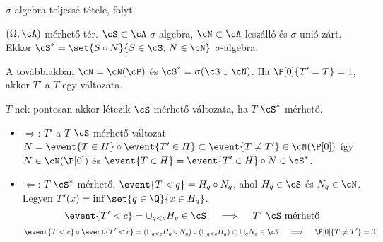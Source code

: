 \documentclass[aspectratio=169,notheorems,9pt,\option]{beamer}
\begin{document}
\begin{frame}{$\sigma$-algebra teljessé tétele, folyt.}
  \begin{proposition}
    $(\Omega,\cA)$ mérhető tér. $\cS\subset\cA$ $\sigma$-algebra, 
    $\cN\subset\cA$ leszálló és $\sigma$-unió zárt. Ekkor
    $\cS^*=\set{S\circ N}{S\in\cS,\,N\in\cN}$ $\sigma$-algebra.
  \end{proposition}
  
  A továbbiakban $\cN=\cN(\cP)$ és $\cS^*=\sigma(\cS\cup\cN)$.
  Ha $\P[0]{T'=T}=1$, akkor %
  $T'$ a $T$ egy változata.
  \begin{proposition}
    $T$-nek pontosan akkor létezik $\cS$ mérhető változata, ha $T$ $\cS^*$ mérhető.
  \end{proposition}
  \begin{itemize}
    \item $\Rightarrow$: $T'$  a $T$ $\cS$ mérhető változat 
    $N=\event{T\in H}\circ\event{T'\in H}\subset \event{T\neq T'}\in\cN(\P[0])$ 
    így $N\in\cN(\P[0])$ 
    és $\event{T\in H}=\event{T'\in H}\circ N\in \cS^*$. 
    \item $\Leftarrow$: $T$ $\cS^*$ mérhető. $\event{T<q}=H_q\circ N_q$, 
    ahol $H_q\in\cS$ és $N_q\in\cN$.
    \pause
    Legyen $T'(x)=\inf\set{q\in\Q}{x\in H_q}$.
    \pause
    \begin{displaymath}
      \event{T'<c}=\cup_{q<c} H_q\in\cS\quad\implies\quad \text{$T'$ $\cS$ mérhető}
    \end{displaymath} 
    \pause
    \begin{displaymath}
      \event{T<c}\circ\event{T'<c}=(\cup_{q<c}H_q\circ N_q)\circ(\cup_{q<c}H_q)
      \subset\cup_q N_q\in\cN \quad\implies\quad\P[0]{T\neq T'}=0.
    \end{displaymath}
  \end{itemize}  
\end{frame}

  
\end{document}
